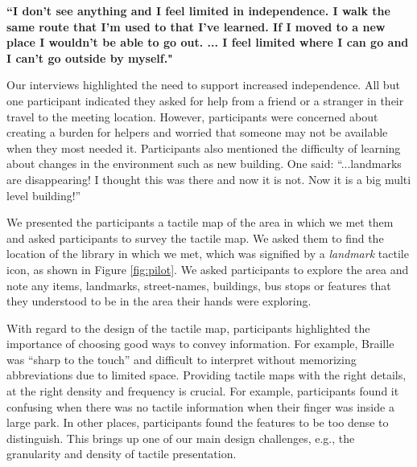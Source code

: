 \textbf{“I don’t see anything and I feel limited in independence. I walk the same route that I’m used to that I’ve learned. If I moved to a new place I wouldn’t be able to go out. ... I feel limited where I can go and I can’t go outside by myself."}

Our interviews highlighted the need to support increased independence. All but one participant indicated they asked for help from a friend or a stranger in their travel to the meeting location. %
However, participants were concerned about creating a burden for helpers and worried that someone may not be available when they most needed it. 
Participants also mentioned the difficulty of learning about changes in the environment such as new building. One said: %
``...landmarks are disappearing! I thought this was there and now it is not. Now it is a big multi level building!''

We presented the participants a tactile map of the area in which we met them and asked participants to survey the tactile map. We asked them to find the location of the library in which we met, which was signified by a \textit{landmark} tactile icon, as shown in Figure \ref{fig:pilot}. We asked participants to explore the area and note any items, landmarks, street-names, buildings, bus stops or features that they understood to be in the area their hands were exploring. %




With regard to the design of the tactile map, participants highlighted the importance of choosing good ways to convey information. For example, Braille was ``sharp to the touch'' and difficult to interpret without memorizing abbreviations due to limited space. Providing tactile maps with the right details, at the right density and frequency is crucial. For example, participants found it confusing when there was no tactile information when their finger was inside a large park. In other places, participants found the features to be too dense to distinguish. This brings up one of our main design challenges, e.g., the granularity and density of tactile presentation.

